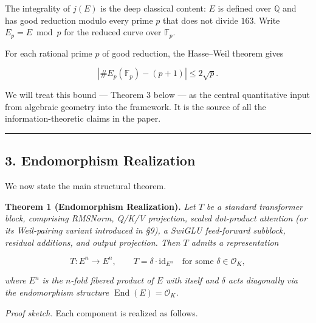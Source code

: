 \documentclass[
  11pt,
]{article}
\begin{document}
The integrality of \(j(E)\) is the deep classical content: \(E\) is
defined over \(\mathbb{Q}\) and has good reduction modulo every prime
\(p\) that does not divide \(163\). Write \(E_p = E \bmod p\) for the
reduced curve over \(\mathbb{F}_p\).

For each rational prime \(p\) of good reduction, the Hasse--Weil theorem
gives

\[|\#E_p(\mathbb{F}_p) - (p+1)| \leq 2\sqrt{p}.\]

We will treat this bound --- Theorem 3 below --- as the central
quantitative input from algebraic geometry into the framework. It is the
source of all the information-theoretic claims in the paper.

\begin{center}\rule{0.5\linewidth}{0.5pt}\end{center}

\hypertarget{endomorphism-realization}{%
\subsection{3. Endomorphism
Realization}\label{endomorphism-realization}}

We now state the main structural theorem.

\textbf{Theorem 1 (Endomorphism Realization).} \emph{Let \(T\) be a
standard transformer block, comprising RMSNorm, Q/K/V projection, scaled
dot-product attention (or its Weil-pairing variant introduced in §9), a
SwiGLU feed-forward subblock, residual additions, and output projection.
Then \(T\) admits a representation}

\[T : E^n \longrightarrow E^n, \qquad T = \delta \cdot \mathrm{id}_{E^n} \quad \text{for some } \delta \in \mathcal{O}_K,\]

\emph{where \(E^n\) is the \(n\)-fold fibered product of \(E\) with
itself and \(\delta\) acts diagonally via the endomorphism structure
\(\operatorname{End}(E) = \mathcal{O}_K\).}

\emph{Proof sketch.} Each component is realized as follows.
\end{document}
